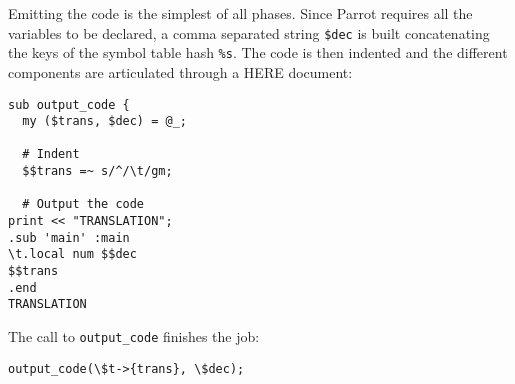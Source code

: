 Emitting the code is the simplest of all phases.
Since Parrot requires all the variables to be declared,
a comma separated string \verb|$dec|  is built
concatenating the keys of the symbol table hash \verb|%s|.
The code is then indented and the different components
are articulated through a HERE document:
\begin{verbatim}
sub output_code {
  my ($trans, $dec) = @_;

  # Indent
  $$trans =~ s/^/\t/gm;

  # Output the code
print << "TRANSLATION";
.sub 'main' :main
\t.local num $$dec
$$trans
.end
TRANSLATION
\end{verbatim}
The call to \verb|output_code| finishes the job:
\begin{verbatim}
output_code(\$t->{trans}, \$dec);
\end{verbatim}
